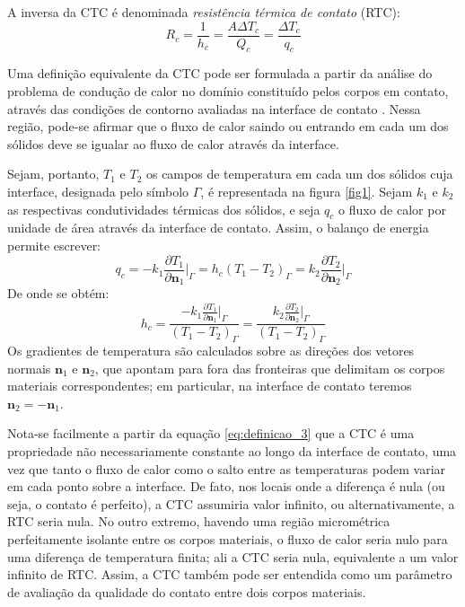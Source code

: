 A inversa da CTC é denominada \textit{resistência térmica de contato} (RTC):
\begin{equation}
	R_c = \frac{1}{h_c} = \frac{A\Delta T_c}{Q_c} = \frac{\Delta T_c}{q_c}
\end{equation}

Uma definição equivalente da CTC pode ser formulada a partir da análise do problema de condução de calor no domínio constituído pelos
corpos em contato, através das condições de contorno avaliadas na interface de contato \citep{livro_ozisik}. Nessa região, pode-se afirmar que o fluxo
de calor saindo ou entrando em cada um dos sólidos deve se igualar ao fluxo de calor através da interface.

Sejam, portanto, $T_1$ e $T_2$ os campos de temperatura em cada um dos sólidos cuja interface, designada pelo símbolo $\Gamma$, é representada na figura \ref{fig1}. Sejam $k_1$ e $k_2$
as respectivas condutividades térmicas dos sólidos, e seja $q_c$ o fluxo de calor por unidade de área através da interface de contato. Assim, o balanço de energia permite escrever:
\begin{equation}
	q_c = -k_1\frac{\partial T_1}{\partial \mathbf{n}_1}\bigg|_\Gamma
	=
	h_c(T_1 - T_2)_\Gamma
	=
	k_2\frac{\partial T_2}{\partial \mathbf{n}_2}\bigg|_\Gamma \label{eq:definicao_2}
\end{equation}
De onde se obtém:
\begin{equation}
	h_c = \frac{-k_1\displaystyle\frac{\partial T_1}{\partial \mathbf{n}_1}\bigg|_\Gamma}{(T_1 - T_2)_\Gamma} = \frac{k_2\displaystyle\frac{\partial T_2}{\partial \mathbf{n}_2}\bigg|_\Gamma}{(T_1 - T_2)_\Gamma} \label{eq:definicao_3}
\end{equation}
Os gradientes de temperatura são calculados sobre as direções dos vetores normais
$\mathbf{n}_1$ e $\mathbf{n}_2$, que apontam para fora das fronteiras que delimitam os corpos materiais correspondentes; em particular,
na interface de contato teremos $\mathbf{n}_2 = -\mathbf{n}_1$.

Nota-se facilmente a partir da equação \eqref{eq:definicao_3} que a CTC é uma propriedade não necessariamente constante ao longo da interface de contato,
uma vez que tanto o fluxo de calor como o salto entre as temperaturas podem variar em cada ponto sobre a interface. De fato, nos locais onde a diferença é nula (ou seja, o contato
é perfeito), a CTC assumiria valor infinito, ou alternativamente, a RTC seria nula. No outro extremo, havendo uma região micrométrica perfeitamente
isolante entre os corpos materiais, o fluxo de calor seria nulo para uma diferença de temperatura finita; ali a CTC seria nula, equivalente a um valor
infinito de RTC. Assim, a CTC também pode ser entendida como um parâmetro de avaliação da qualidade do contato entre dois corpos materiais.

